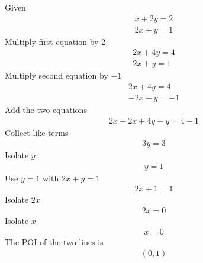 \begin{questions}
\begin{solution}
Given
\begin{gather*}
x+2y=2\\
2x+y=1
\end{gather*}
Multiply first equation by 2
\begin{gather*}
2x+4y=4\\
2x+y=1
\end{gather*}
Multiply second equation by $-1$
\begin{gather*}
2x+4y=4\\
-2x-y=-1
\end{gather*}
Add the two equations
\begin{gather*}
2x-2x+4y-y=4-1
\end{gather*}
Collect like terms
\begin{gather*}
3y=3
\end{gather*}
Isolate $y$
\begin{gather*}
y=1
\end{gather*}
Use $y=1$ with $2x+y=1$
\begin{gather*}
2x+1=1
\end{gather*}
Isolate $2x$
\begin{gather*}
2x=0
\end{gather*}
Isolate $x$
\begin{gather*}
x=0
\end{gather*}
The POI of the two lines is
\begin{gather*}
(0,1)
\end{gather*}
\end{solution}

\newpage



\newpage


\end{questions}
